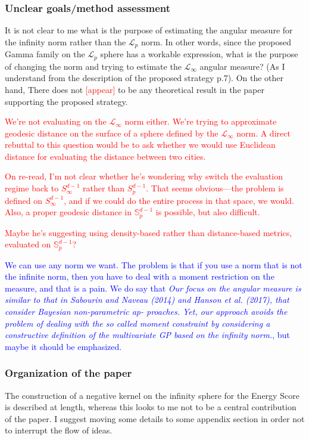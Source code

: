 \documentclass[10pt]{article}
\newcommand{\bruno}[1]{\textcolor{blue}{#1}} %
\newcommand{\peter}[1]{\textcolor{red}{#1}}  %
\begin{document}
\subsubsection*{Unclear goals/method assessment}
It is not clear to me what is the purpose of estimating the angular measure for the infinity norm rather than the $\mathcal{L}_p$ norm. In other words, since the proposed Gamma family on the $\mathcal{L}_p$ sphere has a workable expression, what is the purpose of changing the norm and trying to estimate the $\mathcal{L}_{\infty}$ angular measure? (As I understand from the description of the proposed strategy p.7). On the other hand, There does not \peter{[appear]} to be any theoretical result in the paper supporting the proposed strategy.

\peter{We're not evaluating on the $\mathcal{L}_{\infty}$ norm either. We're trying to approximate geodesic distance on the surface of a sphere defined by the $\mathcal{L}_{\infty}$ norm.  A direct rebuttal to this question would be to ask whether we would use Euclidean distance for evaluating the distance between two cities.}



\peter{On re-read, I'm not clear whether he's wondering why switch the evaluation regime back to $S_{\infty}^{d-1}$ rather than $S_{p}^{d-1}$.  That seems obvious---the problem is defined on $S_{\infty}^{d-1}$, and if we could do the entire process in that space, we would.  Also, a proper geodesic distance in $\mathbb{S}_p^{d-1}$ is possible, but also difficult.}


\peter{Maybe he's suggesting using density-based rather than distance-based metrics, evaluated on $\mathbb{S}_p^{d-1}$?}

\bruno{We can use any norm we want. The problem is that if you use a norm that is not the infinite norm, then you have to deal with a moment restriction on the measure, and that is a pain. We do say that \emph{Our focus on the angular measure is similar to that in Sabourin
and Naveau (2014) and Hanson et al. (2017), that consider Bayesian non-parametric ap-
proaches. Yet, our approach avoids the problem of dealing with the so called moment
constraint by considering a constructive definition of the multivariate GP based on the
infinity norm.}, but maybe it should be emphasized.}
\subsubsection*{Organization of the paper}
The construction of a negative kernel on the infinity sphere for the Energy Score is described at length, whereas this looks to me not to be a central contribution of the paper. I suggest moving some details to some appendix section in order not to interrupt the flow of ideas.
\end{document}
